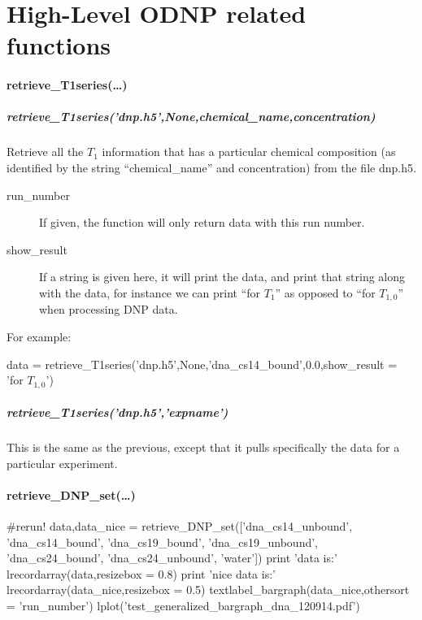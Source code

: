 \section{High-Level ODNP related functions}
\paragraph{retrieve\_T1series(\ldots)}
\subparagraph{retrieve\_T1series('dnp.h5',None,chemical\_name,concentration)}
Retrieve all the $T_1$ information that has a particular chemical
    composition (as identified by the string ``chemical\_name''
    and concentration) from the file dnp.h5.

\begin{description}
    \item[run\_number] If given, the function will only return
        data with this run number.
    \item[show\_result] If a string is given here, it will print
        the data, and print that string along with the data, for
        instance we can print ``for $T_1$'' as opposed to ``for
        $T_{1,0}$'' when processing DNP data.
\end{description}

For example:

\begin{python}
data = retrieve_T1series('dnp.h5',None,'dna_cs14_bound',0.0,show_result
= 'for $T_{1,0}$')
\end{python}

\subparagraph{retrieve\_T1series('dnp.h5','expname')}
This is the same as the previous, except that it pulls
    specifically the data for a particular experiment.
\paragraph{retrieve\_DNP\_set(\ldots)}

\begin{python}
#rerun!
data,data_nice = retrieve_DNP_set(['dna_cs14_unbound',
                                            'dna_cs14_bound',
                                            'dna_cs19_bound',
                                            'dna_cs19_unbound',
                                            'dna_cs24_bound',
                                            'dna_cs24_unbound',
                                            'water'])
print 'data is:'
lrecordarray(data,resizebox = 0.8)
print 'nice data is:'
lrecordarray(data_nice,resizebox = 0.5)
textlabel_bargraph(data_nice,othersort = 'run_number')
lplot('test_generalized_bargraph_dna_120914.pdf')
\end{python}

